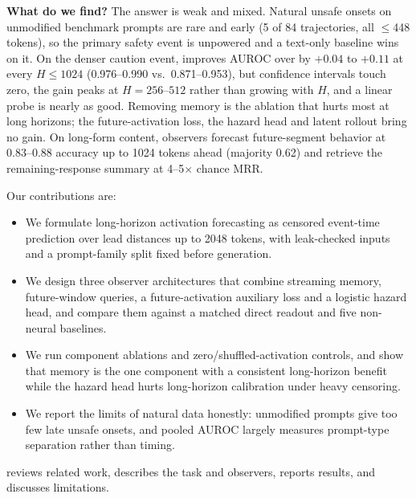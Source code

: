 {\bf What do we find?}
The answer is weak and mixed.
Natural unsafe onsets on unmodified benchmark prompts are rare and early (5 of 84 trajectories, all $\le$448 tokens), so the primary safety event is unpowered and a text-only baseline wins on it.
On the denser caution event, \hier improves AUROC over \directao by $+0.04$ to $+0.11$ at every $H \le 1024$ (0.976--0.990 vs.\ 0.871--0.953), but confidence intervals touch zero, the gain peaks at $H=256$--$512$ rather than growing with $H$, and a linear probe is nearly as good.
Removing memory is the ablation that hurts most at long horizons; the future-activation loss, the hazard head and latent rollout bring no gain.
On long-form content, observers forecast future-segment behavior at 0.83--0.88 accuracy up to 1024 tokens ahead (majority 0.62) and retrieve the remaining-response summary at 4--5$\times$ chance MRR.

Our contributions are:
\begin{itemize}[leftmargin=*,itemsep=0pt,topsep=0pt]
    \item We formulate long-horizon activation forecasting as censored event-time prediction over lead distances up to 2048 tokens, with leak-checked inputs and a prompt-family split fixed before generation.
    \item We design three observer architectures that combine streaming memory, future-window queries, a future-activation auxiliary loss and a logistic hazard head, and compare them against a matched direct readout and five non-neural baselines.
    \item We run component ablations and zero/shuffled-activation controls, and show that memory is the one component with a consistent long-horizon benefit while the hazard head hurts long-horizon calibration under heavy censoring.
    \item We report the limits of natural data honestly: unmodified prompts give too few late unsafe onsets, and pooled AUROC largely measures prompt-type separation rather than timing.
\end{itemize}

 reviews related work,  describes the task and observers,  reports results, and  discusses limitations.

